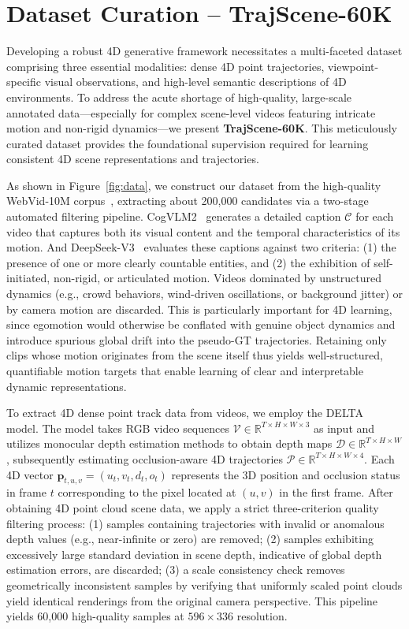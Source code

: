 \section{Dataset Curation -- TrajScene-60K}
\label{sec:data}
Developing a robust 4D generative framework necessitates a multi-faceted dataset comprising three essential modalities: dense 4D point trajectories, viewpoint-specific visual observations, and high-level semantic descriptions of 4D environments. To address the acute shortage of high-quality, large-scale annotated data---especially for complex scene-level videos featuring intricate motion and non-rigid dynamics---we present \textbf{TrajScene-60K}. This meticulously curated dataset provides the foundational supervision required for learning consistent 4D scene representations and trajectories.

As shown in Figure~\ref{fig:data}, we construct our dataset from the high-quality WebVid-10M corpus~\cite{webvid}, extracting about 200,000 candidates via a two-stage automated filtering pipeline. 
CogVLM2~\cite{cogvlm2} generates a detailed caption $\mathcal{C}$ for each video that captures both its visual content and the temporal characteristics of its motion.
And DeepSeek-V3~\cite{deepseekv3} evaluates these captions against two criteria: (1) the presence of one or more clearly countable entities, and (2) the exhibition of self-initiated, non-rigid, or articulated motion. 
Videos dominated by unstructured dynamics (e.g., crowd behaviors, wind-driven oscillations, or background jitter) or by camera motion are discarded. This is particularly important for 4D learning, since egomotion would otherwise be conflated with genuine object dynamics and introduce spurious global drift into the pseudo-GT trajectories. Retaining only clips whose motion originates from the scene itself thus yields well-structured, quantifiable motion targets that enable learning of clear and interpretable dynamic representations.


To extract 4D dense point track data from videos, we employ the DELTA~\cite{delta} model. The model takes RGB video sequences $\mathcal{V} \in \mathbb{R}^{T \times H \times W \times 3}$ as input and utilizes monocular depth estimation methods to obtain depth maps $\mathcal{D} \in \mathbb{R}^{T \times H \times W}$, subsequently estimating occlusion-aware 4D trajectories $\mathcal{P} \in \mathbb{R}^{T \times H \times W \times 4}$. Each 4D vector $\mathbf{p}_{t,u,v} = (u_t, v_t, d_t, o_t)$ represents the 3D position and occlusion status in frame $t$ corresponding to the pixel located at $(u, v)$ in the first frame. After obtaining 4D point cloud scene data, we apply a strict three-criterion quality filtering process: (1) samples containing trajectories with invalid or anomalous depth values (e.g., near-infinite or zero) are removed; (2) samples exhibiting excessively large standard deviation in scene depth, indicative of global depth estimation errors, are discarded; (3)
a scale consistency check removes geometrically inconsistent samples by verifying that uniformly scaled point clouds yield identical renderings from the original camera perspective.
This pipeline yields 60,000 high-quality samples at $596\times336$ resolution.

